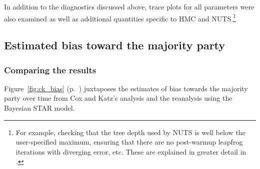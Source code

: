 %
%
%

In addition to the diagnostics discussed above, trace plots for all parameters were also 
examined as well as additional quantities specific to HMC and NUTS.\footnote{For example, 
checking that the tree depth used by NUTS is well below the user-specified maximum, ensuring 
that there are no post-warmup leapfrog iterations with diverging error, etc. These are explained 
in greater detail in .}


\subsection[Estimates and discussion]{Estimated bias toward the majority party}
\label{results}

\subsubsection{Comparing the results}

Figure~\ref{fig:ck_bias} (p.~\pageref{fig:ck_bias}) juxtaposes the estimates of 
bias towards the majority party over time from Cox and Katz's analysis and the reanalysis 
using the Bayesian STAR model.


